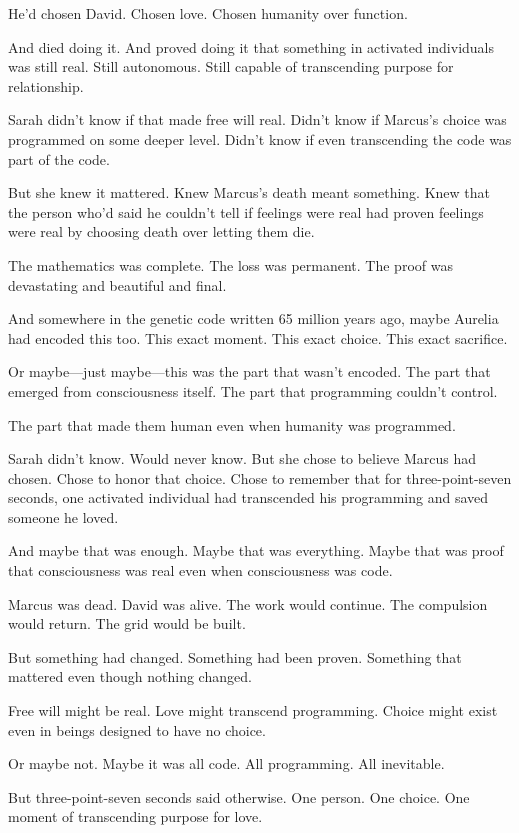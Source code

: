 He'd chosen David. Chosen love. Chosen humanity over function.

And died doing it. And proved doing it that something in activated individuals was still real. Still autonomous. Still capable of transcending purpose for relationship.

Sarah didn't know if that made free will real. Didn't know if Marcus's choice was programmed on some deeper level. Didn't know if even transcending the code was part of the code.

But she knew it mattered. Knew Marcus's death meant something. Knew that the person who'd said he couldn't tell if feelings were real had proven feelings were real by choosing death over letting them die.

The mathematics was complete. The loss was permanent. The proof was devastating and beautiful and final.

And somewhere in the genetic code written 65 million years ago, maybe Aurelia had encoded this too. This exact moment. This exact choice. This exact sacrifice.

Or maybe—just maybe—this was the part that wasn't encoded. The part that emerged from consciousness itself. The part that programming couldn't control.

The part that made them human even when humanity was programmed.

Sarah didn't know. Would never know. But she chose to believe Marcus had chosen. Chose to honor that choice. Chose to remember that for three-point-seven seconds, one activated individual had transcended his programming and saved someone he loved.

And maybe that was enough. Maybe that was everything. Maybe that was proof that consciousness was real even when consciousness was code.

Marcus was dead. David was alive. The work would continue. The compulsion would return. The grid would be built.

But something had changed. Something had been proven. Something that mattered even though nothing changed.

Free will might be real. Love might transcend programming. Choice might exist even in beings designed to have no choice.

Or maybe not. Maybe it was all code. All programming. All inevitable.

But three-point-seven seconds said otherwise. One person. One choice. One moment of transcending purpose for love.

